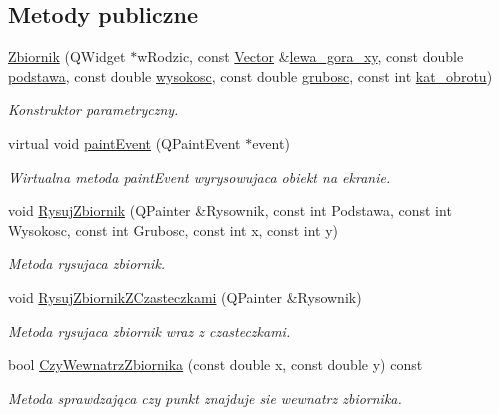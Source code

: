 \subsection*{Metody publiczne}
\begin{DoxyCompactItemize}
\item 
\hyperlink{class_zbiornik_a11d5608bafb33c6bdb0b9710492b1554}{Zbiornik} (Q\+Widget $\ast$w\+Rodzic, const \hyperlink{class_vector}{Vector} \&\hyperlink{class_zbiornik_a811829ed13289d4fad56ae5fcd92bec8}{lewa\+\_\+gora\+\_\+xy}, const double \hyperlink{class_zbiornik_ac64f411a313024c52dbc1c18897df573}{podstawa}, const double \hyperlink{class_zbiornik_a72ab0eb9f3562de0ea90e176f515be42}{wysokosc}, const double \hyperlink{class_zbiornik_a34b0e660d8d6c4d1f45f06f5063b9788}{grubosc}, const int \hyperlink{class_zbiornik_ab0a2ae2523139dadc52a9499a6c2ab98}{kat\+\_\+obrotu})
\begin{DoxyCompactList}\small\item\em Konstruktor parametryczny. \end{DoxyCompactList}\item 
virtual void \hyperlink{class_zbiornik_af7a9c185e95b92de342c6dc69f020765}{paint\+Event} (Q\+Paint\+Event $\ast$event)
\begin{DoxyCompactList}\small\item\em Wirtualna metoda paint\+Event wyrysowujaca obiekt na ekranie. \end{DoxyCompactList}\item 
void \hyperlink{class_zbiornik_ad15f40d418d9ebf261de0eabe8cc2906}{Rysuj\+Zbiornik} (Q\+Painter \&Rysownik, const int Podstawa, const int Wysokosc, const int Grubosc, const int x, const int y)
\begin{DoxyCompactList}\small\item\em Metoda rysujaca zbiornik. \end{DoxyCompactList}\item 
void \hyperlink{class_zbiornik_af831a2751191eab54fb6438392ac6edb}{Rysuj\+Zbiornik\+Z\+Czasteczkami} (Q\+Painter \&Rysownik)
\begin{DoxyCompactList}\small\item\em Metoda rysujaca zbiornik wraz z czasteczkami. \end{DoxyCompactList}\item 
bool \hyperlink{class_zbiornik_a60fd88e85e8696cfec92cd24609e7410}{Czy\+Wewnatrz\+Zbiornika} (const double x, const double y) const 
\begin{DoxyCompactList}\small\item\em Metoda sprawdzająca czy punkt znajduje sie wewnatrz zbiornika. \end{DoxyCompactList}\item 

\end{DoxyCompactItemize}
